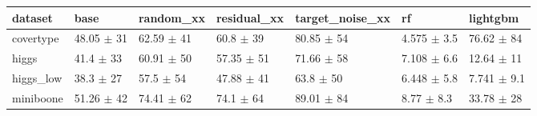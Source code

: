 \begin{tabular}{lllllll}
\toprule
dataset & base & random\_xx & residual\_xx & target\_noise\_xx & rf & lightgbm \\
\midrule
covertype & 48.05 $\pm$ 31 & 62.59 $\pm$ 41 & 60.8 $\pm$ 39 & 80.85 $\pm$ 54 & 4.575 $\pm$ 3.5 & 76.62 $\pm$ 84 \\
higgs & 41.4 $\pm$ 33 & 60.91 $\pm$ 50 & 57.35 $\pm$ 51 & 71.66 $\pm$ 58 & 7.108 $\pm$ 6.6 & 12.64 $\pm$ 11 \\
higgs\_low & 38.3 $\pm$ 27 & 57.5 $\pm$ 54 & 47.88 $\pm$ 41 & 63.8 $\pm$ 50 & 6.448 $\pm$ 5.8 & 7.741 $\pm$ 9.1 \\
miniboone & 51.26 $\pm$ 42 & 74.41 $\pm$ 62 & 74.1 $\pm$ 64 & 89.01 $\pm$ 84 & 8.77 $\pm$ 8.3 & 33.78 $\pm$ 28 \\
\bottomrule
\end{tabular}
